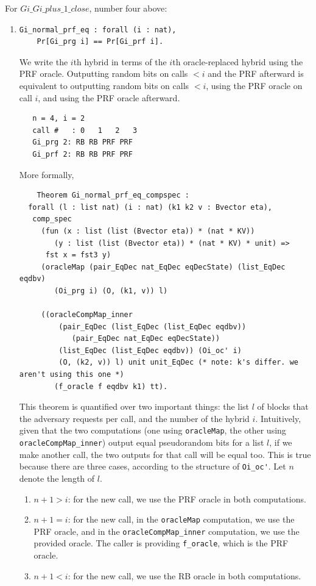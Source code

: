\documentclass[12pt,lot, lof]{puthesis}
\newcommand{\li} {\lstinline}
\begin{document}
{\begin{enumerate}
\end{enumerate} 


For $Gi\_Gi\_plus\_1\_close$, number four above:
\begin{enumerate}
\par
\item \begin{lstlisting}
Gi_normal_prf_eq : forall (i : nat),
    Pr[Gi_prg i] == Pr[Gi_prf i].
    \end{lstlisting}
    
    We write the $i$th hybrid in terms of the $i$th oracle-replaced hybrid using the PRF oracle. Outputting random bits on calls $< i$ and the PRF afterward is equivalent to outputting random bits on calls $< i$, using the PRF oracle on call $i$, and using the PRF oracle afterward. 
    \begin{lstlisting}
   n = 4, i = 2
   call #   : 0   1   2   3
   Gi_prg 2: RB RB PRF PRF
   Gi_prf 2: RB RB PRF PRF
    \end{lstlisting}
    
    More formally,
    \begin{lstlisting}
    Theorem Gi_normal_prf_eq_compspec :
  forall (l : list nat) (i : nat) (k1 k2 v : Bvector eta),
   comp_spec
     (fun (x : list (list (Bvector eta)) * (nat * KV))
        (y : list (list (Bvector eta)) * (nat * KV) * unit) =>
      fst x = fst3 y)
     (oracleMap (pair_EqDec nat_EqDec eqDecState) (list_EqDec eqdbv)
        (Oi_prg i) (O, (k1, v)) l)
        
     ((oracleCompMap_inner
         (pair_EqDec (list_EqDec (list_EqDec eqdbv))
            (pair_EqDec nat_EqDec eqDecState))
         (list_EqDec (list_EqDec eqdbv)) (Oi_oc' i) 
         (O, (k2, v)) l) unit unit_EqDec (* note: k's differ. we aren't using this one *)
        (f_oracle f eqdbv k1) tt).
    \end{lstlisting}
    
    This theorem is quantified over two important things: the list $l$ of blocks that the adversary requests per call, and the number of the hybrid $i$. Intuitively, given that the two computations (one using \li|oracleMap|, the other using \li|oracleCompMap_inner|) output equal pseudorandom bits for a list $l$, if we make another call, the two outputs for that call will be equal too. This is true because there are three cases, according to the structure of \li|Oi_oc'|. Let $n$ denote the length of $l$.
    \begin{enumerate}
    \item $n+1 > i$: for the new call, we use the PRF oracle in both computations.
    \item $n+1 = i$: for the new call, in the \li|oracleMap| computation, we use the PRF oracle, and in the \li|oracleCompMap_inner| computation, we use the provided oracle. The caller is providing \li|f_oracle|, which is the PRF oracle.
    \item $n +1 < i$: for the new call, we use the RB oracle in both computations.
    \end{enumerate}
    

\end{enumerate}}
\end{document}
